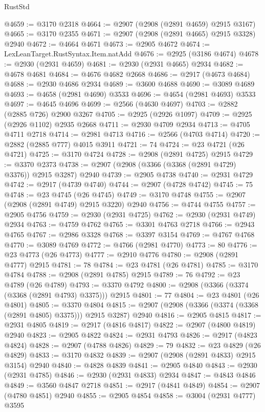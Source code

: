 \begin{lexlean}{RustStd}
\begin{coremodule}
@4659 := @3170 @2318
@4664 := @2907 (@2908 (@2891 @4659) @2915 @3167)
@4665 := @3170 @2355
@4671 := @2907 (@2908 (@2891 @4665) @2915 @3328) @2940
@4672 := @4664 @4671
@4673 := @2905 @4672
@4674 := LexLeanTarget.RustSyntax.Item.natAdd
@4676 := @2925 (@3186 @4674)
@4678 := @2930 (@2931 @4659)
@4681 := @2930 (@2931 @4665) @2934
@4682 := @4678 @4681
@4684 := @4676 @4682 @2668
@4686 := @2917 (@4673 @4684)
@4688 := @2930 @4686 @2934
@4689 := @3600 @4688
@4690 := @3089 @4689
@4693 := @4658 (@2981 @4690) @3533
@4696 := @4654 (@2981 @4693) @3533
@4697 := @4645 @4696
@4699 := @2566 (@4630 @4697)
@4703 := @2882 (@2885 @726) @2900 @3267
@4705 := @2925 (@2926 @1097)
@4709 := @2925 (@2926 @1102) @2935 @2668
@4711 := @2930 @4709 @2934
@4713 := @4705 @4711 @2718
@4714 := @2981 @4713
@4716 := @2566 (@4703 @4714)
@4720 := @2882 (@2885 @777) @4015 @3911
@4721 := 74
@4724 := @23 @4721 (@26 @4721)
@4725 := @3170 @4724
@4728 := @2908 (@2891 @4725) @2915
@4729 := @3370 @2373
@4738 := @2907 (@2908 (@3366 (@3368 (@2891 @4729) @3376)) @2915 @3287) @2940
@4739 := @2905 @4738
@4740 := @2931 @4729
@4742 := @2917 (@4739 @4740)
@4744 := @2907 (@4728 @4742)
@4745 := 75
@4748 := @23 @4745 (@26 @4745)
@4749 := @3170 @4748
@4755 := @2907 (@2908 (@2891 @4749) @2915 @3220) @2940
@4756 := @4744 @4755
@4757 := @2905 @4756
@4759 := @2930 (@2931 @4725)
@4762 := @2930 (@2931 @4749) @2934
@4763 := @4759 @4762
@4765 := @3301 @4763 @2718
@4766 := @2943 @4765
@4767 := @2986 @3328
@4768 := @3397 @3154
@4769 := @4767 @4768
@4770 := @3089 @4769
@4772 := @4766 (@2981 @4770)
@4773 := 80
@4776 := @23 @4773 (@26 @4773)
@4777 := @2910 @4776
@4780 := @2908 (@2891 @4777) @2915
@4781 := 78
@4784 := @23 @4781 (@26 @4781)
@4785 := @3170 @4784
@4788 := @2908 (@2891 @4785) @2915
@4789 := 76
@4792 := @23 @4789 (@26 @4789)
@4793 := @3370 @4792
@4800 := @2908 (@3366 (@3374 (@3368 (@2891 @4793) @3375))) @2915
@4801 := 77
@4804 := @23 @4801 (@26 @4801)
@4805 := @3370 @4804
@4815 := @2907 (@2908 (@3366 (@3374 (@3368 (@2891 @4805) @3375))) @2915 @3287) @2940
@4816 := @2905 @4815
@4817 := @2931 @4805
@4819 := @2917 (@4816 @4817)
@4822 := @2907 (@4800 @4819) @2940
@4823 := @2905 @4822
@4824 := @2931 @4793
@4826 := @2917 (@4823 @4824)
@4828 := @2907 (@4788 @4826)
@4829 := 79
@4832 := @23 @4829 (@26 @4829)
@4833 := @3170 @4832
@4839 := @2907 (@2908 (@2891 @4833) @2915 @3154) @2940
@4840 := @4828 @4839
@4841 := @2905 @4840
@4843 := @2930 (@2931 @4785)
@4846 := @2930 (@2931 @4833) @2934
@4847 := @4843 @4846
@4849 := @3560 @4847 @2718
@4851 := @2917 (@4841 @4849)
@4854 := @2907 (@4780 @4851) @2940
@4855 := @2905 @4854
@4858 := @3004 (@2931 @4777) @3595

\end{coremodule}
\end{lexlean}
